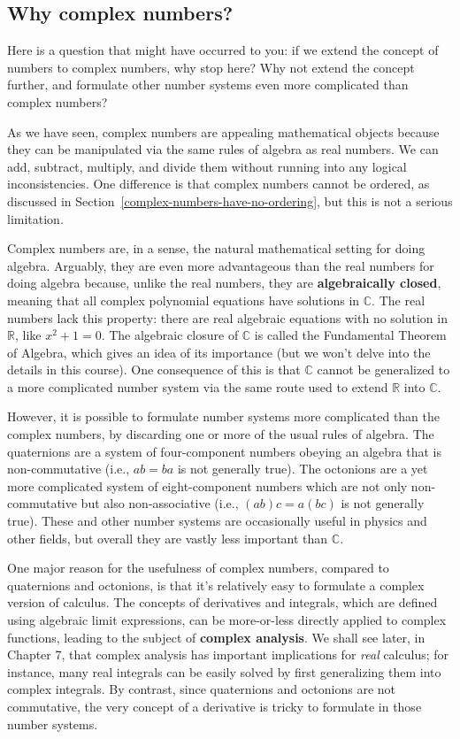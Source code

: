 \documentclass[10pt,a4paper]{article}
\begin{document}
\subsection{Why complex numbers?}\label{why-complex-numbers}

Here is a question that might have occurred to you: if we extend the
concept of numbers to complex numbers, why stop here? Why not extend
the concept further, and formulate other number systems even more
complicated than complex numbers?

As we have seen, complex numbers are appealing mathematical objects
because they can be manipulated via the same rules of algebra as real
numbers. We can add, subtract, multiply, and divide them without
running into any logical inconsistencies. One difference is that
complex numbers cannot be ordered, as discussed in
Section~\ref{complex-numbers-have-no-ordering}, but this is not a
serious limitation.

Complex numbers are, in a sense, the natural mathematical setting for
doing algebra. Arguably, they are even more advantageous than the real
numbers for doing algebra because, unlike the real numbers, they are
\textbf{algebraically closed}, meaning that all complex polynomial
equations have solutions in $\mathbb{C}$. The real numbers lack this
property: there are real algebraic equations with no solution in
$\mathbb{R}$, like $x^2 + 1 = 0$.  The algebraic closure of
$\mathbb{C}$ is called the Fundamental Theorem of Algebra, which gives
an idea of its importance (but we won't delve into the details in this
course). One consequence of this is that $\mathbb{C}$ cannot be
generalized to a more complicated number system via the same route
used to extend $\mathbb{R}$ into $\mathbb{C}$.

However, it is possible to formulate number systems more complicated
than the complex numbers, by discarding one or more of the usual rules
of algebra.  The quaternions are a system of four-component numbers
obeying an algebra that is non-commutative (i.e., $ab = ba$ is not
generally true).  The octonions are a yet more complicated system of
eight-component numbers which are not only non-commutative but also
non-associative (i.e., $(ab)c = a(bc)$ is not generally true).  These
and other number systems are occasionally useful in physics and other
fields, but overall they are vastly less important than $\mathbb{C}$.

One major reason for the usefulness of complex numbers, compared to
quaternions and octonions, is that it's relatively easy to formulate a
complex version of calculus. The concepts of derivatives and
integrals, which are defined using algebraic limit expressions, can be
more-or-less directly applied to complex functions, leading to the
subject of \textbf{complex analysis}.  We shall see later, in Chapter
7, that complex analysis has important implications for \textit{real}
calculus; for instance, many real integrals can be easily solved by
first generalizing them into complex integrals.  By contrast, since
quaternions and octonions are not commutative, the very concept of a
derivative is tricky to formulate in those number systems.
\end{document}
